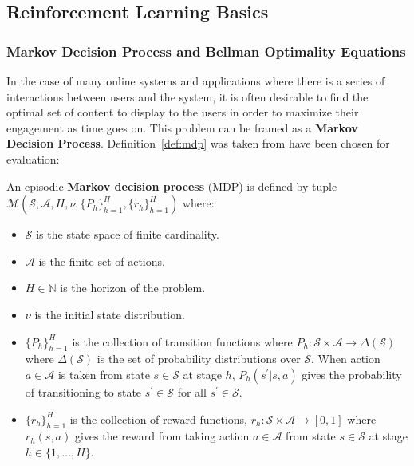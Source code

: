 \documentclass{mldsmsc}
\begin{document}
\subsection{Reinforcement Learning Basics}

\subsubsection{Markov Decision Process and Bellman Optimality Equations}

In the case of many online systems and applications where there is a series of interactions between
users and the system, it is often desirable to find the optimal set of content to display to the
users in order to maximize their engagement as time goes on. This problem can be framed as a
\textbf{Markov Decision Process}. Definition~\ref{def:mdp} was taken from \citep{pike-burke2024LearnigAgents}
have been chosen for evaluation:

\begin{definition}\label{def:mdp}
    An episodic \textbf{Markov decision process} (MDP) is defined by tuple $\mathcal{M}
    (\mathcal{S},\mathcal{A}, H,\nu, \{P_{h}\}_{h=1}^{H},\{r_{h}\}_{h=1}^{H})$ where:
    \begin{itemize}
        \item $\mathcal{S}$ is the state space of finite cardinality.
        \item $\mathcal{A}$ is the finite set of actions.
        \item $H \in \mathbb{N}$ is the horizon of the problem.
        \item $\nu$ is the initial state distribution.
        \item $\{P_{h}\}_{h=1}^{H}$ is the collection of transition functions where
        $P_h: \mathcal{S} \times \mathcal{A} \rightarrow \Delta(\mathcal{S})$
        where $\Delta(\mathcal{S})$ is the set of probability distributions over
        $\mathcal{S}$. When action $a \in \mathcal{A}$ is taken from state $s \in \mathcal{S}$
        at stage $h$, $P_h(s^\prime | s, a)$ gives the probability of transitioning to state
        $s^\prime \in \mathcal{S}$ for all $s^\prime \in \mathcal{S}$.
        \item $\{r_{h}\}_{h=1}^{H}$ is the collection of reward functions, $r_h : \mathcal{S} \times \mathcal{A} \rightarrow [0,1]$
        where $r_h(s,a)$ gives the reward from taking action $a \in \mathcal{A}$ from state $s \in \mathcal{S}$
        at stage $h \in \{1, \ldots, H\}$.
    \end{itemize}
\end{definition}
\end{document}
